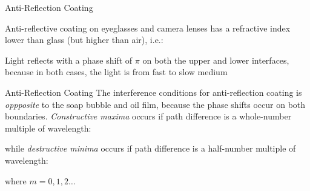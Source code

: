 \documentclass[12pt,compress,aspectratio=169]{beamer}
\begin{document}
\begin{frame}{Anti-Reflection Coating}
  \begin{center}
  \end{center}
  
  \vspace{-.1in}Anti-reflective coating on eyeglasses and camera lenses
  has a refractive index lower than glass (but higher than air), i.e.:


  \vspace{-.13in}Light reflects with a phase shift of $\pi$ on both the upper
  and lower interfaces, because in both cases, the light is from fast to
  slow medium
\end{frame}




\begin{frame}{Anti-Reflection Coating}
  The interference conditions for anti-reflection coating is \emph{oppposite}
  to the soap bubble and oil film, because the phase shifts occur on both
  boundaries. \emph{Constructive maxima} occurs if path difference is a
  whole-number multiple of wavelength:


  while \emph{destructive minima} occurs if path difference is a half-number
  multiple of wavelength:


  where $m=0,1,2\ldots$
\end{frame}
\end{document}
